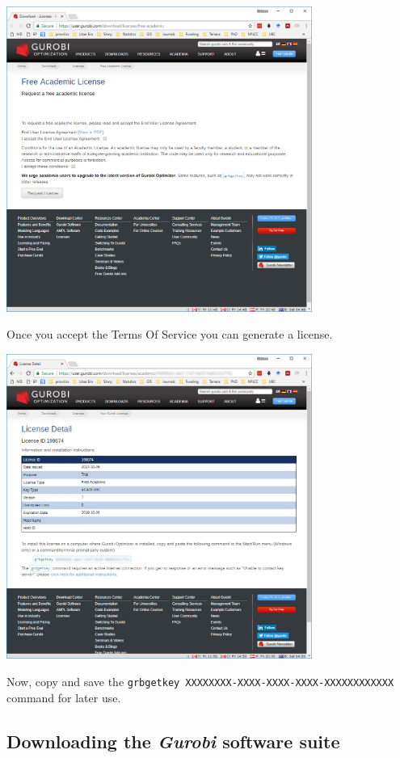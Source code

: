 \documentclass[
  12pt,
]{book}
\begin{document}
\includegraphics[width=0.75\textwidth,height=\textheight]{images/free-academic-license-page.png}

Once you accept the Terms Of Service you can generate a license.

\includegraphics[width=0.75\textwidth,height=\textheight]{images/actual-license.png}

Now, copy and save the \texttt{grbgetkey\ XXXXXXXX-XXXX-XXXX-XXXX-XXXXXXXXXXXX} command for later use.

\hypertarget{downloading-the-gurobi-software-suite}{%
\subsection{\texorpdfstring{Downloading the \emph{Gurobi} software suite}{Downloading the Gurobi software suite}}\label{downloading-the-gurobi-software-suite}}
\end{document}
